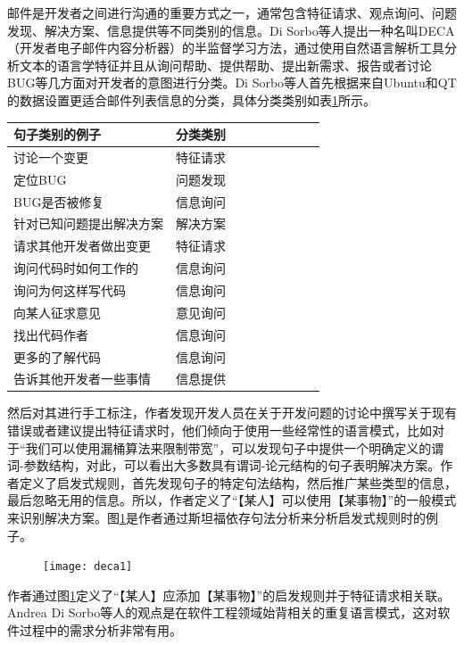 邮件是开发者之间进行沟通的重要方式之一，通常包含特征请求、观点询问、问题发现、解决方案、信息提供等不同类别的信息。Di Sorbo等人\cite{Sorbo2016Development}提出一种名叫DECA（开发者电子邮件内容分析器）的半监督学习方法，通过使用自然语言解析工具分析文本的语言学特征并且从询问帮助、提供帮助、提出新需求、报告或者讨论BUG等几方面对开发者的意图进行分类。Di Sorbo等人首先根据来自Ubuntu和QT的数据设置更适合邮件列表信息的分类，具体分类类别如表\ref{tab:deca0}所示。
\begin{table}[htbp]
    \label{tab:deca0}
    \centering
    \footnotesize%
    \setlength{\tabcolsep}{4pt}%
    \renewcommand{\arraystretch}{1.2}%
\begin{tabular}{lcccccccc}
\hline
句子类别的例子      & 分类类别 \\
\hline
讨论一个变更       & 特征请求 \\
定位BUG        & 问题发现 \\
BUG是否被修复     & 信息询问 \\
针对已知问题提出解决方案 & 解决方案 \\
请求其他开发者做出变更  & 特征请求 \\
询问代码时如何工作的   & 信息询问 \\
询问为何这样写代码    & 信息询问 \\
向某人征求意见      & 意见询问 \\
找出代码作者       & 信息询问 \\
更多的了解代码      & 信息询问 \\
告诉其他开发者一些事情  & 信息提供 \\
\hline
\end{tabular}
\end{table}
然后对其进行手工标注，作者发现开发人员在关于开发问题的讨论中撰写关于现有错误或者建议提出特征请求时，他们倾向于使用一些经常性的语言模式，比如对于“我们可以使用漏桶算法来限制带宽”，可以发现句子中提供一个明确定义的谓词-参数结构，对此，可以看出大多数具有谓词-论元结构的句子表明解决方案。作者定义了启发式规则，首先发现句子的特定句法结构，然后推广某些类型的信息，最后忽略无用的信息。所以，作者定义了“【某人】可以使用【某事物】”的一般模式来识别解决方案。图\ref{fig:deca1}是作者通过斯坦福依存句法分析来分析启发式规则时的例子。
\begin{figure}[htbp]
    \centering
    \texttt{[image: deca1]}
    \label{fig:deca1}
\end{figure}
作者通过图\ref{fig:deca1}定义了“【某人】应添加【某事物】”的启发规则并于特征请求相关联。Andrea Di Sorbo等人的观点是在软件工程领域始背相关的重复语言模式，这对软件过程中的需求分析非常有用。

